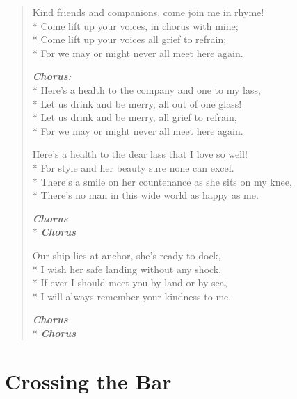 \documentclass[9pt,twoside]{extarticle}
\makeatletter
\newenvironment{xverse}{
	\begin{verse}
	\fontsize{8.5}{10.5}\selectfont
}{
	\end{verse}
}
\newcommand{\chorusdef}{\textbf{\emph{Chorus:}}\\*}
\newcommand{\chorus@mark}[1][1]{%
\textbf{\emph{Chorus \ifthenelse{\equal{#1}{1}}{}{$\times$ #1}}}%
}
\newcommand{\chorusmark}[1][1]{%
\ifvmode%
\vspace{-0.5\stanzaskip}%
\chorus@mark[#1]%
\vspace{-0.5\stanzaskip}%
\else \\*%
\chorus@mark[#1]%
\fi%
}
\makeatother
\begin{document}
\begin{xverse}
Kind friends and companions, come join me in rhyme! \\*
Come lift up your voices, in chorus with mine; \\*
Come lift up your voices all grief to refrain; \\*
For we may or might never all meet here again.

\chorusdef
Here’s a health to the company and one to my lass, \\*
Let us drink and be merry, all out of one glass! \\*
Let us drink and be merry, all grief to refrain, \\*
For we may or might never all meet here again.

Here’s a health to the dear lass that I love so well! \\*
For style and her beauty sure none can excel. \\*
There’s a smile on her countenance as she sits on my knee, \\*
There's no man in this wide world as happy as me.

\chorusmark

Our ship lies at anchor, she's ready to dock, \\*
I wish her safe landing without any shock. \\*
If ever I should meet you by land or by sea, \\*
I will always remember your kindness to me.

\chorusmark
\end{xverse}

\section{Crossing the Bar}
\end{document}
